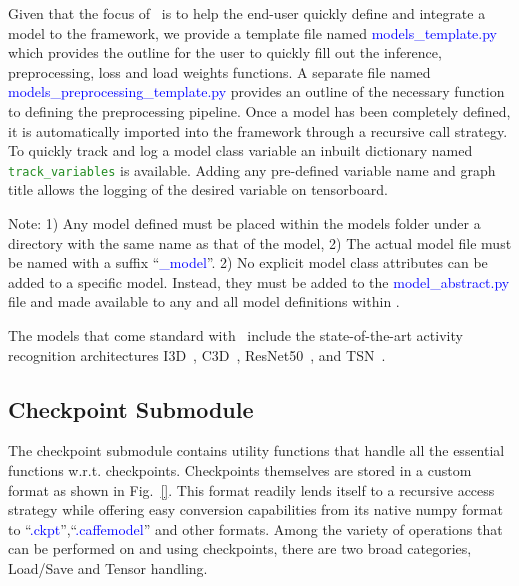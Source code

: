 \documentclass{llncs}
\begin{document}
Given that the focus of \acro~is to help the end-user quickly define and integrate a model to the framework, we provide a template file named \textcolor{blue}{models\_template.py} which provides the outline for the user to quickly fill out the inference, preprocessing, loss and load weights functions.
A separate file named \textcolor{blue}{models\_preprocessing\_template.py} provides an outline of the necessary function to defining the preprocessing pipeline.
Once a model has been completely defined, it is automatically imported into the framework through a recursive call strategy.
To quickly track and log a model class variable an inbuilt dictionary named \texttt{\textcolor{ForestGreen}{track\_variables}} is available.
Adding any pre-defined variable name and graph title allows the logging of the desired variable on tensorboard.

Note: 1) Any model defined must be placed within the models folder under a directory with the same name as that of the model,
2) The actual model file must be named with a suffix ``\textcolor{blue}{\_model}''.
2) No explicit model class attributes can be added to a specific model. Instead, they must be added to the \textcolor{blue}{model\_abstract.py} file and made available to any and all model definitions within \acro.

The models that come standard with \acro~include the state-of-the-art activity recognition architectures I3D~\cite{}, C3D~\cite{}, ResNet50~\cite{}, and TSN~\cite{}.

\subsection{Checkpoint Submodule}
\label{sec:checkpoint}
The checkpoint submodule contains utility functions that handle all the essential functions w.r.t. checkpoints.
Checkpoints themselves are stored in a custom format as shown in Fig.~\ref{}.
This format readily lends itself to a recursive access strategy while offering easy conversion capabilities from its native numpy format to ``\textcolor{blue}{.ckpt}'',``\textcolor{blue}{.caffemodel}'' and other formats.
Among the variety of operations that can be performed on and using checkpoints, there are two broad categories, Load/Save and Tensor handling.
\end{document}
